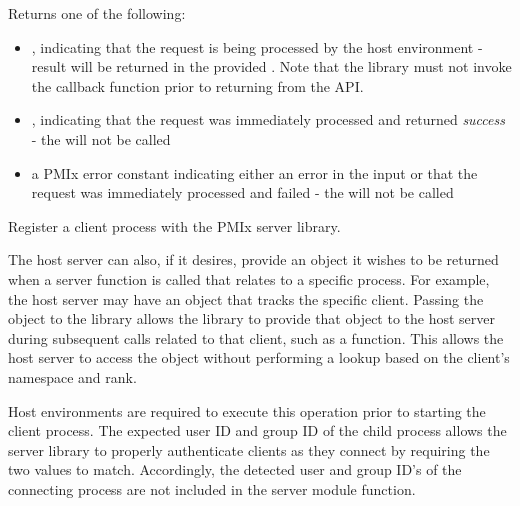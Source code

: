 \begin{arglist}
\end{arglist}

Returns one of the following:

\begin{itemize}
    \item {}, indicating that the request is being processed by the host environment - result will be returned in the provided . Note that the library must not invoke the callback function prior to returning from the \ac{API}.
    \item {}, indicating that the request was immediately processed and returned \textit{success} - the  will not be called
    \item a PMIx error constant indicating either an error in the input or that the request was immediately processed and failed - the  will not be called
\end{itemize}


\descr

Register a client process with the PMIx server library.

The host server can also, if it desires, provide an object it wishes to be returned when a server function is called that relates to a specific process.
For example, the host server may have an object that tracks the specific client.
Passing the object to the library allows the library to provide that object to the host server during subsequent calls related to that client, such as a  function.  This allows the host server to access the object without performing a lookup based on the client's namespace and rank.

\advicermstart
Host environments are required to execute this operation prior to starting the client process.
The expected user ID and group ID of the child process allows the server library to properly authenticate clients as they connect by requiring the two values to match. Accordingly, the detected user and group ID's of the connecting process are not included in the  server module function.
\advicermend

